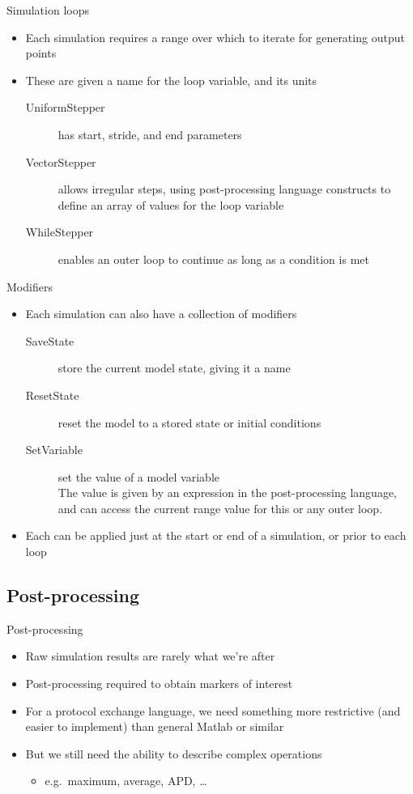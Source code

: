 \documentclass[t,xcolor={usenames,dvipsnames}]{beamer}
\newcommand{\subitem}[1]{\begin{itemize}[<.->]\item #1 \end{itemize}}
\begin{document}
\begin{frame}{Simulation loops}
\begin{itemize}
\item Each simulation requires a \alert{range} over which to iterate for generating output points
\item These are given a name for the loop variable, and its units
  \begin{description}
  \item[UniformStepper] has start, stride, and end parameters
  \item[VectorStepper] allows irregular steps, using post-processing language constructs to define an array of values for the loop variable
  \item[WhileStepper] enables an outer loop to continue as long as a condition is met
  \end{description}
\end{itemize}
\end{frame}

\begin{frame}{Modifiers}
\begin{itemize}
\item Each simulation can also have a collection of \alert{modifiers}
  \begin{description}
  \item[SaveState] store the current model state, giving it a name
  \item[ResetState] reset the model to a stored state or initial conditions
  \item[SetVariable] set the value of a model variable\\
      The value is given by an expression in the post-processing language,
      and can access the current range value for this or any outer loop.
  \end{description}
\item Each can be applied just at the start or end of a simulation, or prior to each loop
\end{itemize}
\end{frame}

\subsection{Post-processing}

\begin{frame}{Post-processing}
\begin{itemize}
\item Raw simulation results are rarely what we're after
\item Post-processing required to obtain markers of interest
\item For a protocol exchange language, we need something more restrictive (and easier to implement) than general Matlab or similar
\item But we still need the ability to describe complex operations
  \subitem{e.g.\ maximum, average, APD, \ldots}
\end{itemize}
\end{frame}
\end{document}
